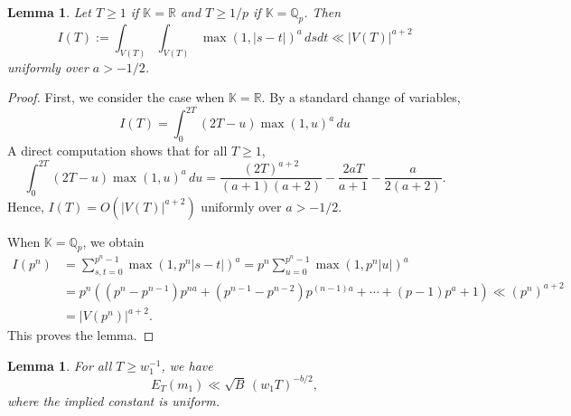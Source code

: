 \documentclass[11pt,reqno,a4paper]{amsart}
\numberwithin{equation}{section}
\newcommand{\cL}{\mathcal{L}}
\newcommand{\bK}{\mathbb{K}}
\newcommand{\bQ}{\mathbb{Q}}
\newcommand{\bR}{\mathbb{R}}
\theoremstyle{theorem}
\newtheorem{lemma}[theorem]{Lemma}
\theoremstyle{definition}
\begin{document}
\begin{lemma}
	\label{l:integral}
	Let $T\ge 1$ if $\bK=\bR$ and $T\ge 1/p$ if $\bK=\bQ_p$. Then
	$$
	I(T):=\int_{V(T)}\int_{V(T)} \max(1,|s-t|)^a\, dsdt\ll |V(T)|^{a+2}
	$$
	uniformly over $a>-1/2$.
\end{lemma}

\begin{proof}
First, we consider the case when $\bK=\bR$. By a standard change of variables,
$$
I(T)=\int_0^{2T} (2T -u) \max(1,u)^a \, du
$$
A direct computation shows that for all $T\ge 1$,
$$
\int_0^{2T} (2T -u) \max(1,u)^a \, du =
\frac{(2T)^{a+2}}{(a+1)(a+2)}-\frac{2aT}{a+1}-\frac{a}{2(a+2)}.
$$
Hence, $I(T)=O(|V(T)|^{a+2})$ uniformly over $a>-1/2$.

When $\bK=\bQ_p$, we obtain
\begin{align*}
I(p^n)&=\sum_{s,t=0}^{p^n-1}\max(1, p^n|s-t|)^a
=p^n\sum_{u=0}^{p^n-1} \max(1, p^n|u|)^a\\
&= p^n ( (p^n-p^{n-1}) p^{na}+(p^{n-1}-p^{n-2}) p^{(n-1)a}+\cdots+(p-1)p^a+1)
\ll (p^n)^{a+2}\\
&=|V(p^n)|^{a+2}.
\end{align*}
This proves the lemma.
\end{proof}

\begin{lemma}
\label{lemmaII.3}
For all $T \ge w_1^{-1}$, we have
\begin{equation}
\label{eqlemmaII.1}
E_T(m_1) \ll \sqrt{B}\, (w_1 T)^{-b/2},
\end{equation}
where the implied constant is uniform.
\end{lemma}
\end{document}
